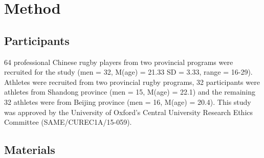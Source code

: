 


\section{Method}


\subsection{Participants}
64 professional Chinese rugby players from two provincial programs were recruited for the study (men = 32, M(age) = 21.33 SD = 3.33, range = 16-29).  Athletes were recruited from two provincial rugby programs, 32
participants were athletes from Shandong province (men = 15, M(age) = 22.1) and the remaining 32 athletes were from Beijing province (men = 16, M(age) = 20.4).  This study was approved by the University of Oxford’s Central University Research Ethics Committee (SAME/CUREC1A/15-059).


\subsection{Materials}


